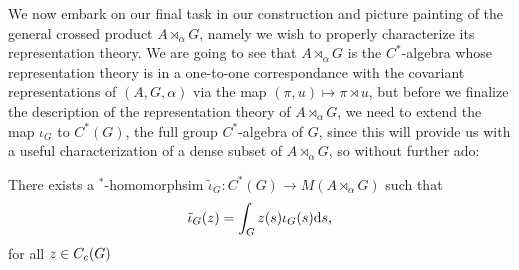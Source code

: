 We now embark on our final task in our construction and picture painting of the general crossed product $A \rtimes_ \alpha G$, namely we wish to properly characterize its representation theory. We are going to see that $A \rtimes_\alpha G$ is the $C^*$-algebra whose representation theory is in a one-to-one correspondance with the covariant representations of $(A,G,\alpha)$ via the map $(\pi,u) \mapsto \pi \rtimes u$, but before we finalize the description of the representation theory of $A \rtimes_\alpha G$, we need to extend the map $\iota_G$ to $C^*(G)$, the full group $C^*$-algebra of $G$, since this will provide us with a useful characterization of a dense subset of $A \rtimes_\alpha G$, so without further ado:
\begin{lemma}
There exists a $^*$-homomorphsim $\tilde \iota_G \colon C^*(G) \to M(A \rtimes_\alpha G)$ such that
\begin{align*}
	\tilde \iota_G(z) = \int_G z(s) \iota_G(s) \mathrm{d} s, 
\end{align*}
for all $z \in C_c(G)$
\label{cross:2.35}
\end{lemma}
